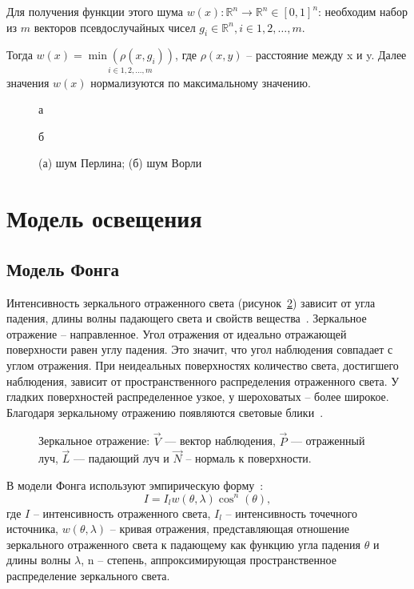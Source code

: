 Для получения функции этого шума $w(x): \mathbb{R}^n \rightarrow \mathbb{R}^n \in [0, 1]^n$: необходим набор из $m$ векторов псевдослучайных чисел $g_i \in \mathbb{R}^n, i \in 1, 2, \ldots, m$.

Тогда $w(x) = \underset{i \in 1, 2, \ldots, m}{\min \left( \rho(x, g_i) \right)}$, где $\rho(x, y)$ -- расстояние между x и y. Далее значения $w(x)$ нормализуются по максимальному значению.

\begin{figure}[htb!]
	\centering
	\begin{minipage}{0.48\textwidth}
		\centering
		
		\caption*{а}
	\end{minipage}
	\hfill
	\begin{minipage}{0.48\textwidth}
		\centering
		
		\caption*{б}
	\end{minipage}
	\caption{(а) шум Перлина; (б) шум Ворли}
	\label{fig:noise-images}
\end{figure}

\section{Модель освещения}
\subsection{Модель Фонга}
Интенсивность зеркального отраженного света (рисунок~\ref{fig:phong}) зависит от угла падения, длины волны падающего света и свойств вещества~\cite{rodgers1989algorithms}. Зеркальное отражение -- направленное. Угол отражения от идеально отражающей поверхности равен углу падения. Это значит, что угол наблюдения совпадает с углом отражения. При неидеальных поверхностях количество света, достигшего наблюдения, зависит от пространственного распределения отраженного света. У гладких поверхностей распределенное узкое, у шероховатых -- более широкое. Благодаря зеркальному отражению появляются световые блики~\cite{rodgers1989algorithms}.
\begin{figure}[ht!]
	\centering
	   
	\caption{Зеркальное отражение: $\vec{V}$ — вектор наблюдения, $\vec{P}$ — отраженный луч, $\vec{L}$ — падающий луч и $\vec{N}$ -- нормаль к поверхности.} 
	\label{fig:phong}
\end{figure}

В модели Фонга используют эмпирическую форму~\cite{rodgers1989algorithms}:
\begin{equation}
	\label{eq:phong}
	I = I_lw(\theta,\lambda)\cos^n(\theta),
\end{equation}
где $I$ -- интенсивность отраженного света, $I_l$ -- интенсивность точечного источника, $w(\theta, \lambda)$ -- кривая отражения, представляющая отношение зеркального отраженного света к падающему как функцию угла падения $\theta$ и длины волны $\lambda$, n -- степень, аппроксимирующая пространственное распределение зеркального света.

